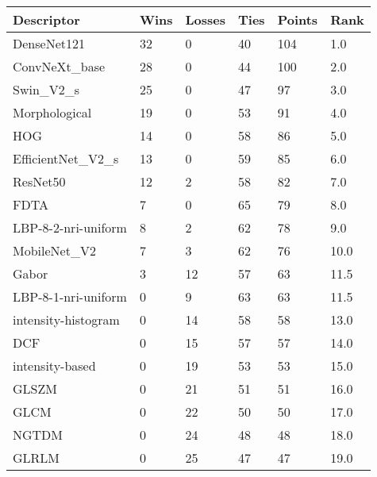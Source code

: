 \begin{tabular}{llllll}\\ 
\toprule
Descriptor & Wins & Losses & Ties & Points & Rank\\ 
\midrule
DenseNet121 & 32 & 0 & 40 & 104 & 1.0\\ 
ConvNeXt_base & 28 & 0 & 44 & 100 & 2.0\\ 
Swin_V2_s & 25 & 0 & 47 & 97 & 3.0\\ 
Morphological & 19 & 0 & 53 & 91 & 4.0\\ 
HOG & 14 & 0 & 58 & 86 & 5.0\\ 
EfficientNet_V2_s & 13 & 0 & 59 & 85 & 6.0\\ 
ResNet50 & 12 & 2 & 58 & 82 & 7.0\\ 
FDTA & 7 & 0 & 65 & 79 & 8.0\\ 
LBP-8-2-nri-uniform & 8 & 2 & 62 & 78 & 9.0\\ 
MobileNet_V2 & 7 & 3 & 62 & 76 & 10.0\\ 
Gabor & 3 & 12 & 57 & 63 & 11.5\\ 
LBP-8-1-nri-uniform & 0 & 9 & 63 & 63 & 11.5\\ 
intensity-histogram & 0 & 14 & 58 & 58 & 13.0\\ 
DCF & 0 & 15 & 57 & 57 & 14.0\\ 
intensity-based & 0 & 19 & 53 & 53 & 15.0\\ 
GLSZM & 0 & 21 & 51 & 51 & 16.0\\ 
GLCM & 0 & 22 & 50 & 50 & 17.0\\ 
NGTDM & 0 & 24 & 48 & 48 & 18.0\\ 
GLRLM & 0 & 25 & 47 & 47 & 19.0\\ 
\bottomrule
\end{tabular}
